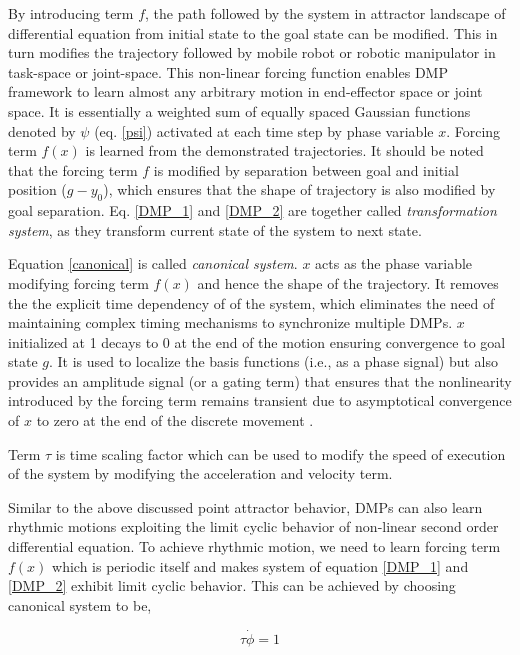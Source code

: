 By introducing term $f$, the path followed by the system in attractor landscape of differential equation from initial state to the goal state can be modified. This in turn modifies the trajectory followed by mobile robot or robotic manipulator in task-space or joint-space. This non-linear forcing function enables DMP framework to learn almost any arbitrary motion in end-effector space or joint space. It is essentially a weighted sum of equally spaced Gaussian functions denoted by $\psi$ (eq. \ref{psi}) activated at each time step by phase variable $x$. Forcing term $f(x)$ is learned from the demonstrated trajectories. It should be noted that the forcing term $f$ is modified by separation between goal and initial position ($g - y_{0}$), which ensures that the shape of trajectory is also modified by goal separation. Eq. \ref{DMP_1} and \ref{DMP_2} are together called \textit{transformation system}, as they transform current state of the system to next state.   

Equation \ref{canonical} is called \textit{canonical system}. $x$ acts as the phase variable modifying forcing term $f(x)$ and hence the shape of the trajectory. It removes the the explicit time dependency of of the system, which eliminates the need of maintaining complex timing mechanisms to synchronize multiple DMPs. $x$ initialized at 1 decays to 0 at the end of the motion ensuring convergence to goal state $g$. It is used to localize the basis functions (i.e., as a phase signal) but also provides an amplitude signal (or a gating term) that ensures that the nonlinearity introduced by the forcing term remains transient due to asymptotical convergence of $x$ to zero at the end of the discrete movement \cite{ijspeert2013dynamical}.

Term $\tau$ is time scaling factor which can be used to modify the speed of execution of the system by modifying the acceleration and velocity term.  

Similar to the above discussed point attractor behavior, DMPs can also learn rhythmic motions exploiting the limit cyclic behavior of non-linear second order differential equation. To achieve rhythmic motion, we need to learn forcing term $f(x)$ which is periodic itself and makes system of equation \ref{DMP_1} and \ref{DMP_2} exhibit limit cyclic behavior. This can be achieved by choosing canonical system to be,

\begin{equation}
	\tau \dot{\phi} = 1
\end{equation}  

